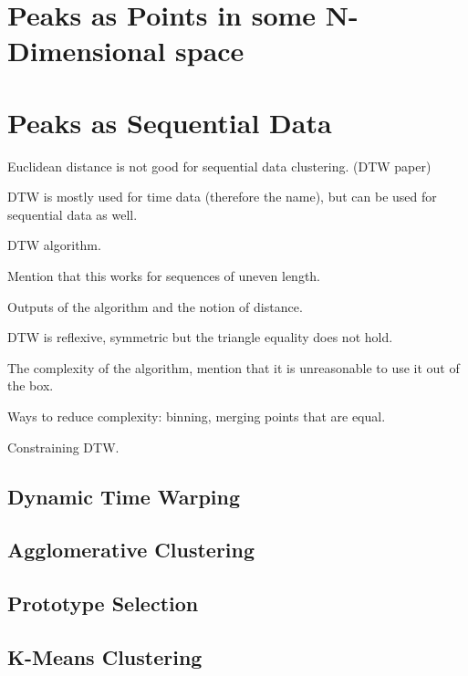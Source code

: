 \documentclass[10pt,a4paper]{article}
\begin{document}
\section{Peaks as Points in some N-Dimensional space}
\section{Peaks as Sequential Data}
Euclidean distance is not good for sequential data clustering. (DTW paper)

DTW is mostly used for time data (therefore the name), but can be used for sequential data as well.

DTW algorithm.

Mention that this works for sequences of uneven length.

Outputs of the algorithm and the notion of distance.

DTW is reflexive, symmetric but the triangle equality does not hold.

The complexity of the algorithm, mention that it is unreasonable to use it out of the box.

Ways to reduce complexity: binning, merging points that are equal.

Constraining DTW. 



\subsection{Dynamic Time Warping}
\subsection{Agglomerative Clustering}
\subsection{Prototype Selection}
\subsection{K-Means Clustering}



\end{document}
